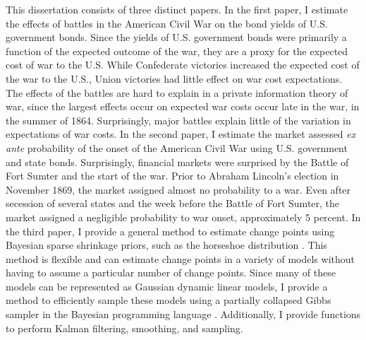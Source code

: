 
This dissertation consists of three distinct papers.
In the first paper, I estimate the effects of battles in the American Civil War on the bond yields of U.S. government bonds.
Since the yields of U.S. government bonds were primarily a function of the expected outcome of the war, they are a proxy for the expected cost of war to the U.S.
While Confederate victories increased the expected cost of the war to the U.S., Union victories had little effect on war cost expectations.
The effects of the battles are hard to explain in a private information theory of war, since the largest effects occur on expected war costs occur late in the war, in the summer of 1864.
Surprisingly, major battles explain little of the variation in expectations of war costs.
In the second paper, I estimate the market assessed \textit{ex ante} probability of the onset of the American Civil War using U.S. government and state bonds.
Surprisingly, financial markets were surprised by the Battle of Fort Sumter and the start of the war.
Prior to Abraham Lincoln's election in November 1869, the market assigned almost no probability to a war.
Even after secession of several states and the week before the Battle of Fort Sumter, the market assigned a negligible probability to war onset, approximately 5 percent.
In the third paper, I provide a general method to estimate change points using Bayesian sparse shrinkage priors, such as the horseshoe distribution \parencite{CarvalhoPolsonScott2010}.
This method is flexible and can estimate change points in a variety of models without having to assume a particular number of change points.
Since many of these models can be represented as Gaussian dynamic linear models, I provide a method to efficiently sample these models using a partially collapsed Gibbs sampler in the Bayesian programming language \Stan{}.
Additionally, I provide \Stan{} functions to perform Kalman filtering, smoothing, and sampling.




